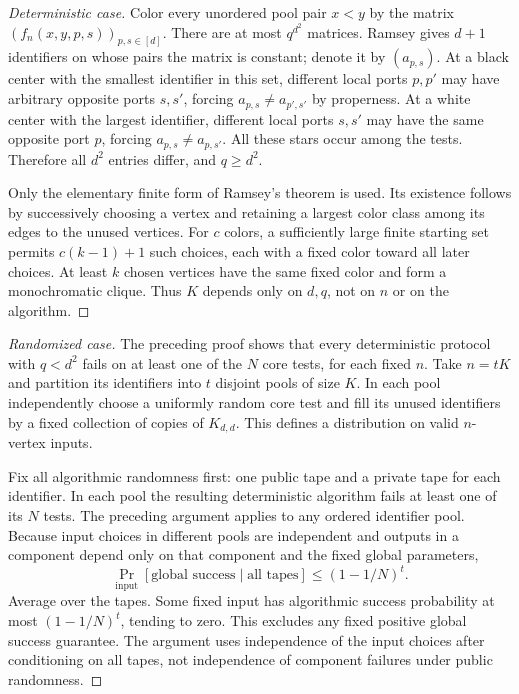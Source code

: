 \documentclass[11pt]{article}
\theoremstyle{definition}
\theoremstyle{remark}
\begin{document}
\begin{proof}[Deterministic case]
Color every unordered pool pair $x<y$ by the matrix
$(f_n(x,y,p,s))_{p,s\in[d]}$. There are at most $q^{d^2}$ matrices.
Ramsey gives $d+1$ identifiers on whose pairs the matrix is constant;
denote it by $(a_{p,s})$. At a black center with the smallest identifier
in this set, different local ports $p,p'$ may have arbitrary opposite
ports $s,s'$, forcing $a_{p,s}\ne a_{p',s'}$ by properness.
At a white center with the largest identifier, different local ports
$s,s'$ may have the same opposite port $p$, forcing
$a_{p,s}\ne a_{p,s'}$. All these stars occur among the tests.
Therefore all $d^2$ entries differ, and $q\ge d^2$.

Only the elementary finite form of Ramsey's theorem is used. Its
existence follows by successively choosing a vertex and retaining a
largest color class among its edges to the unused vertices. For $c$
colors, a sufficiently large finite starting set permits $c(k-1)+1$
such choices, each with a fixed color toward all later choices. At
least $k$ chosen vertices have the same fixed color and form a
monochromatic clique. Thus $K$ depends only on $d,q$, not on $n$ or
on the algorithm.
\end{proof}

\begin{proof}[Randomized case]
The preceding proof shows that every deterministic protocol with
$q<d^2$ fails on at least one of the $N$ core tests, for each fixed $n$.
Take $n=tK$ and partition its identifiers into $t$ disjoint pools of
size $K$. In each pool independently choose a uniformly random core
test and fill its unused identifiers by a fixed collection of copies
of $K_{d,d}$. This defines a distribution on valid $n$-vertex inputs.

Fix all algorithmic randomness first: one public tape and a private
tape for each identifier. In each pool the resulting deterministic
algorithm fails at least one of its $N$ tests. The preceding argument
applies to any ordered identifier pool. Because input choices in
different pools are independent and outputs in a component depend only
on that component and the fixed global parameters,
\[
 \Pr_{\mathrm{input}}[\text{global success}\mid\text{all tapes}]
 \le(1-1/N)^t.
\]
Average over the tapes. Some fixed input has algorithmic success
probability at most $(1-1/N)^t$, tending to zero. This excludes any
fixed positive global success guarantee. The argument uses independence
of the input choices after conditioning on all tapes, not independence
of component failures under public randomness.
\end{proof}
\end{document}
